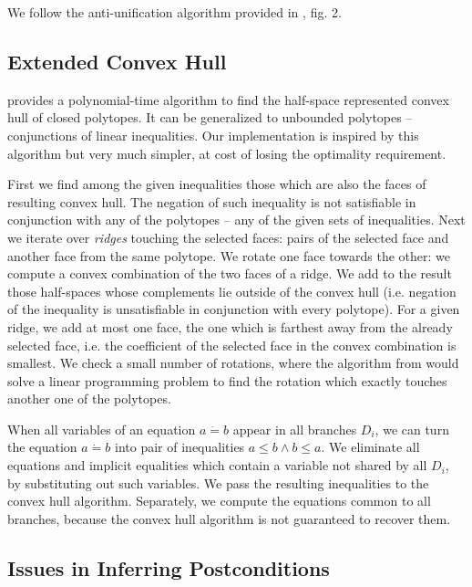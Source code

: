 \documentclass{article}
\newcommand{\tmem}[1]{{\em #1\/}}
\begin{document}
We follow the anti-unification algorithm provided in {\cite{AntiUnifAlg}},
fig. 2.

\subsection{Extended Convex Hull}\label{NumConstrnGenAlg}

{\cite{ConvexHull}} provides a polynomial-time algorithm to find the
half-space represented convex hull of closed polytopes. It can be generalized
to unbounded polytopes -- conjunctions of linear inequalities. Our
implementation is inspired by this algorithm but very much simpler, at cost of
losing the optimality requirement.

First we find among the given inequalities those which are also the faces of
resulting convex hull. The negation of such inequality is not satisfiable in
conjunction with any of the polytopes -- any of the given sets of
inequalities. Next we iterate over {\tmem{ridges}} touching the selected
faces: pairs of the selected face and another face from the same polytope. We
rotate one face towards the other: we compute a convex combination of the two
faces of a ridge. We add to the result those half-spaces whose complements lie
outside of the convex hull (i.e. negation of the inequality is unsatisfiable
in conjunction with every polytope). For a given ridge, we add at most one
face, the one which is farthest away from the already selected face, i.e. the
coefficient of the selected face in the convex combination is smallest. We
check a small number of rotations, where the algorithm from
{\cite{ConvexHull}} would solve a linear programming problem to find the
rotation which exactly touches another one of the polytopes.

When all variables of an equation $a \dot{=} b$ appear in all branches $D_i$,
we can turn the equation $a \dot{=} b$ into pair of inequalities $a \leqslant
b \wedge b \leqslant a$. We eliminate all equations and implicit equalities
which contain a variable not shared by all $D_i$, by substituting out such
variables. We pass the resulting inequalities to the convex hull algorithm.
Separately, we compute the equations common to all branches, because the
convex hull algorithm is not guaranteed to recover them.

\subsection{Issues in Inferring Postconditions}\label{NumConv}
\end{document}
